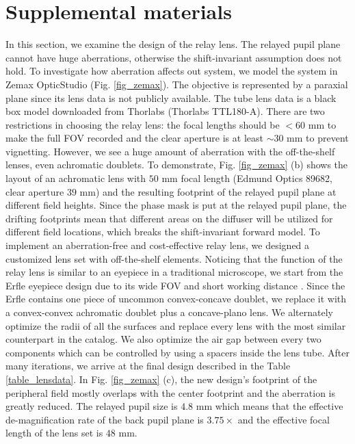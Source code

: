 \documentclass{osa-article}
\begin{document}
\section*{Supplemental materials}

In this section, we examine the design of the relay lens. The relayed pupil plane cannot have huge aberrations, otherwise the shift-invariant assumption does not hold. To investigate how aberration affects out system, we model the system in Zemax OpticStudio (Fig. \ref{fig_zemax}). The objective is represented by a paraxial plane since its lens data is not publicly available. The tube lens data is a black box model downloaded from Thorlabs (Thorlabs TTL180-A). There are two restrictions in choosing the relay lens: the focal lengths should be $< 60$ mm to make the full FOV recorded and the clear aperture is at least $\sim 30$ mm to prevent vignetting. However, we see a huge amount of aberration with the off-the-shelf lenses, even achromatic doublets.  To demonstrate, Fig. \ref{fig_zemax} (b) shows the layout of an achromatic lens with $50$ mm focal length (Edmund Optics 89682, clear aperture $39$ mm) and the resulting footprint of the relayed pupil plane at different field heights. Since the phase mask is put at the relayed pupil plane, the drifting footprints mean that different areas on the diffuser will be utilized for different field locations, which breaks the shift-invariant forward model. To implement an aberration-free and cost-effective relay lens, we designed a customized lens set with off-the-shelf elements. Noticing that the function of the relay lens is similar to an eyepiece in a traditional microscope, we start from the Erfle eyepiece design due to its wide FOV and short working distance \cite{eyepiece}. Since the Erfle contains one piece of uncommon convex-concave doublet, we replace it with a convex-convex achromatic doublet plus a concave-plano lens. We alternately optimize the radii of all the surfaces and replace every lens with the most similar counterpart in the catalog. We also optimize the air gap between every two components which can be controlled by using a spacers inside the lens tube. After many iterations, we arrive at the final design described in the Table \ref{table_lensdata}. In Fig. \ref{fig_zemax} (c), the new design's footprint of the peripheral field mostly overlaps with the center footprint and the aberration is greatly reduced. The relayed pupil size is $4.8$ mm which means that the effective de-magnification rate of the back pupil plane is $3.75 \times$ and the effective focal length of the lens set is $48$ mm. 
\end{document}
